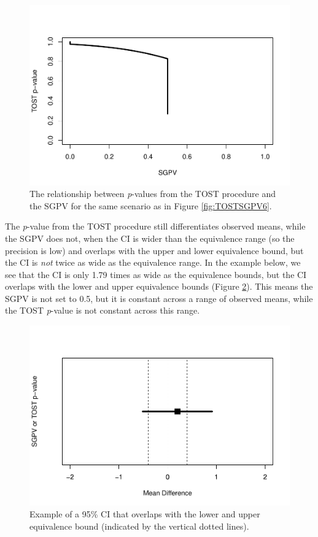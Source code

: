 \documentclass[,man,floatsintext]{apa6}
\begin{document}
\begin{figure}
\centering
\includegraphics{manuscript.R2_files/figure-latex/TOSTSGPV7-1.pdf}
\caption{\label{fig:TOSTSGPV7}The relationship between \emph{p}-values from the TOST procedure and the SGPV for the same scenario as in Figure \ref{fig:TOSTSGPV6}.}
\end{figure}

The \emph{p}-value from the TOST procedure still differentiates observed means, while the SGPV does not, when the CI is wider than the equivalence range (so the precision is low) and overlaps with the upper and lower equivalence bound, but the CI is \emph{not} twice as wide as the equivalence range. In the example below, we see that the CI is only 1.79 times as wide as the equivalence bounds, but the CI overlaps with the lower and upper equivalence bounds (Figure \ref{fig:TOSTSGPV8}). This means the SGPV is not set to 0.5, but it is constant across a range of observed means, while the TOST \emph{p}-value is not constant across this range.

\begin{figure}
\centering
\includegraphics{manuscript.R2_files/figure-latex/TOSTSGPV8-1.pdf}
\caption{\label{fig:TOSTSGPV8}Example of a 95\% CI that overlaps with the lower and upper equivalence bound (indicated by the vertical dotted lines).}
\end{figure}
\end{document}
